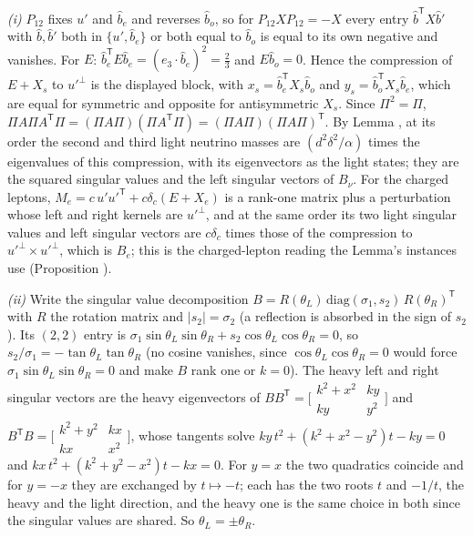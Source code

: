 \emph{(i)} $P_{12}$ fixes $u'$ and $\hat{b}_{e}$ and reverses $\hat{b}_{o}$, so for $P_{12}XP_{12} = -X$ every entry $\hat{b}^{\mathsf{T}}X\hat{b}'$ with $\hat{b}, \hat{b}'$ both in $\{u', \hat{b}_{e}\}$ or both equal to $\hat{b}_{o}$ is equal to its own negative and vanishes. For $E$: $\hat{b}_{e}^{\mathsf{T}}E\hat{b}_{e} = (e_{3} \cdot \hat{b}_{e})^{2} = \tfrac23$ and $E\hat{b}_{o} = 0$. Hence the compression of $E + X_{s}$ to $u'^{\perp}$ is the displayed block, with $x_{s} = \hat{b}_{e}^{\mathsf{T}}X_{s}\hat{b}_{o}$ and $y_{s} = \hat{b}_{o}^{\mathsf{T}}X_{s}\hat{b}_{e}$, which are equal for symmetric and opposite for antisymmetric $X_{s}$. Since $\Pi^{2} = \Pi$, $\Pi A\Pi A^{\mathsf{T}}\Pi = (\Pi A\Pi)(\Pi A^{\mathsf{T}}\Pi) = (\Pi A\Pi)(\Pi A\Pi)^{\mathsf{T}}$. By Lemma , at its order the second and third light neutrino masses are $(d^{2}\delta^{2}/\alpha)$ times the eigenvalues of this compression, with its eigenvectors as the light states; they are the squared singular values and the left singular vectors of $B_{\nu}$. For the charged leptons, $M_{e} = c\,u'u'^{\mathsf{T}} + c\delta_{c}(E + X_{e})$ is a rank-one matrix plus a perturbation whose left and right kernels are $u'^{\perp}$, and at the same order its two light singular values and left singular vectors are $c\delta_{c}$ times those of the compression to $u'^{\perp} \times u'^{\perp}$, which is $B_{e}$; this is the charged-lepton reading the Lemma's instances use (Proposition ).

\emph{(ii)} Write the singular value decomposition $B = R(\theta_{L})\,\mathrm{diag}(\sigma_{1}, s_{2})\,R(\theta_{R})^{\mathsf{T}}$ with $R$ the rotation matrix and $|s_{2}| = \sigma_{2}$ (a reflection is absorbed in the sign of $s_{2}$). Its $(2,2)$ entry is $\sigma_{1}\sin\theta_{L}\sin\theta_{R} + s_{2}\cos\theta_{L}\cos\theta_{R} = 0$, so $s_{2}/\sigma_{1} = -\tan\theta_{L}\tan\theta_{R}$ (no cosine vanishes, since $\cos\theta_{L}\cos\theta_{R} = 0$ would force $\sigma_{1}\sin\theta_{L}\sin\theta_{R} = 0$ and make $B$ rank one or $k = 0$). The heavy left and right singular vectors are the heavy eigenvectors of $BB^{\mathsf{T}} = \bigl[\begin{smallmatrix} k^{2} + x^{2} & ky \\ ky & y^{2} \end{smallmatrix}\bigr]$ and $B^{\mathsf{T}}B = \bigl[\begin{smallmatrix} k^{2} + y^{2} & kx \\ kx & x^{2} \end{smallmatrix}\bigr]$, whose tangents solve $ky\,t^{2} + (k^{2} + x^{2} - y^{2})t - ky = 0$ and $kx\,t^{2} + (k^{2} + y^{2} - x^{2})t - kx = 0$. For $y = x$ the two quadratics coincide and for $y = -x$ they are exchanged by $t \mapsto -t$; each has the two roots $t$ and $-1/t$, the heavy and the light direction, and the heavy one is the same choice in both since the singular values are shared. So $\theta_{L} = \pm\theta_{R}$.


